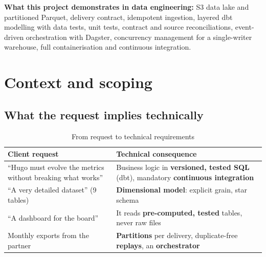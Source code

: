 \documentclass[11pt, a4paper, oneside, headings=normal, numbers=noenddot, DIV=12]{scrartcl}
\begin{document}
\textbf{What this project demonstrates in data engineering:} S3 data lake and partitioned Parquet, delivery contract, idempotent ingestion,
layered dbt modelling with data tests, unit tests, contract and source reconciliations, event-driven orchestration with Dagster,
concurrency management for a single-writer warehouse, full containerisation and continuous integration.

\section{Context and scoping}

\subsection{What the request implies technically}
\begin{table}[H]
\centering\small
\begin{tabularx}{\linewidth}{@{}L{5.4cm} Y@{}}
\toprule
\textbf{Client request} & \textbf{Technical consequence} \\
\midrule
``Hugo must evolve the metrics without breaking what works'' & Business logic in \textbf{versioned, tested SQL} (dbt), mandatory \textbf{continuous integration} \\
``A very detailed dataset'' (9 tables) & \textbf{Dimensional model}: explicit grain, star schema \\
``A dashboard for the board'' & It reads \textbf{pre-computed, tested} tables, never raw files \\
Monthly exports from the partner & \textbf{Partitions} per delivery, duplicate-free \textbf{replays}, an \textbf{orchestrator} \\
\bottomrule
\end{tabularx}
\caption{From request to technical requirements}
\end{table}
\end{document}
